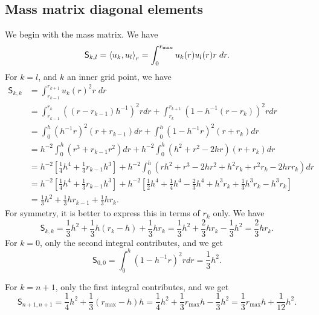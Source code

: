 \documentclass[12pt]{article}
\begin{document}
\subsection{Mass matrix diagonal elements}

We begin with the mass matrix. We have
\begin{equation}
    \mathsf{S}_{k,l} = \braket{u_k,u_l}_r = \int_0^{r_\text{max}} u_k(r) u_l(r) r \; dr.    
\end{equation}
For $k=l$, and $k$ an inner grid point, we have
\begin{align}
    \mathsf{S}_{k,k} &= \int_{r_{k-1}}^{r_{k+1}} u_k(r)^2 r \; dr \\
    &= \int_{r_{k-1}}^{r_k} ((r-r_{k-1}) h^{-1})^2 r dr + \int_{r_k}^{r_{k+1}} (1 - h^{-1}(r - r_{k}))^2 r dr \\
    &= \int_0^h (h^{-1} r)^2 (r + r_{k-1}) dr + \int_0^h (1 - h^{-1} r)^2 (r + r_{k}) dr \\
    &= h^{-2} \int_0^h (r^3 + r_{k-1} r^2) dr + h^{-2} \int_0^h (h^2 + r^2 - 2 hr)(r + r_k) dr   \\
    &= h^{-2} [ \frac{1}{4} h^4 + \frac{1}{3} r_{k-1} h^3] + h^{-2} \int_0^h (rh^2 + r^3 - 2hr^2 + h^2 r_k + r^2 r_k - 2hr r_k) dr \\
    &= h^{-2} [ \frac{1}{4} h^4 + \frac{1}{3} r_{k-1} h^3] 
    + h^{-2} [ \frac{1}{2}h^4 + \frac{1}{4} h^4 - \frac{2}{3} h^4 + h^3 r_k + \frac{1}{3} h^3 r_k - h^3 r_k ] \\
    & = \frac{1}{3} h^2 + \frac{1}{3} h r_{k-1} + \frac{1}{3} h r_k .
\end{align}
For symmetry, it is better to express this in terms of $r_k$ only. We have
\begin{equation}
    \mathsf{S}_{k,k} = \frac{1}{3} h^2 + \frac{1}{3} h (r_k - h) + \frac{1}{3} h r_k  = \frac{1}{3} h^2 + \frac{2}{3} h r_k - \frac{1}{3} h^2 = \frac{2}{3} h r_k.
\end{equation}
For $k=0$, only the second integral contributes, and we get
\begin{equation}
    \mathsf{S}_{0,0} = \int_0^h (1 - h^{-1} r)^2 r dr = \frac{1}{3} h^2.
\end{equation}

For $k=n+1$, only the first integral contributes, and we get
\begin{equation}
    \mathsf{S}_{n+1,n+1} = \frac{1}{4} h^2 + \frac{1}{3} (r_\text{max}-h) h
 = \frac{1}{4} h^2 + \frac{1}{3} r_\text{max} h - \frac{1}{3} h^2 = \frac{1}{3} r_\text{max} h + \frac{1}{12} h^2.
\end{equation}
\end{document}
